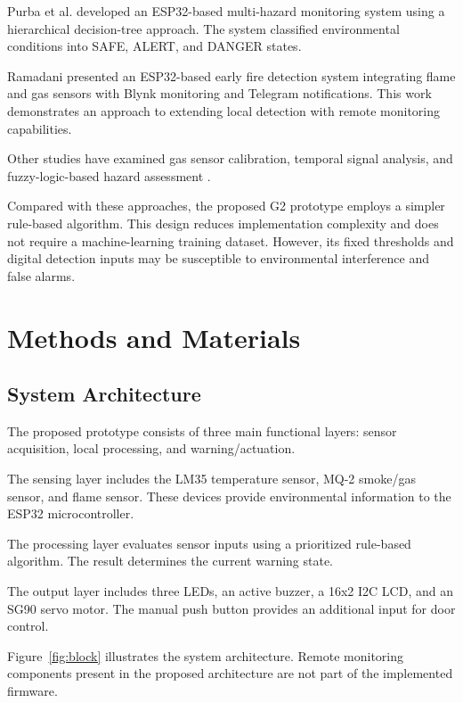 \documentclass[12pt,a4paper]{article}
\begin{document}
Purba et al. \cite{purba2026smartsafety} developed
an ESP32-based multi-hazard monitoring system
using a hierarchical decision-tree approach.
The system classified environmental conditions
into SAFE, ALERT, and DANGER states.

Ramadani \cite{ramadani2026blynk} presented an
ESP32-based early fire detection system integrating
flame and gas sensors with Blynk monitoring and
Telegram notifications. This work demonstrates
an approach to extending local detection with
remote monitoring capabilities.

Other studies have examined gas sensor calibration,
temporal signal analysis, and fuzzy-logic-based
hazard assessment
\cite{solorzano2022gas,nakip2021rtpnn,
rehman2021smartfire}.

Compared with these approaches, the proposed
G2 prototype employs a simpler rule-based algorithm.
This design reduces implementation complexity and
does not require a machine-learning training dataset.
However, its fixed thresholds and digital detection
inputs may be susceptible to environmental
interference and false alarms.

\section{Methods and Materials}

\subsection{System Architecture}

The proposed prototype consists of three main
functional layers: sensor acquisition, local
processing, and warning/actuation.

The sensing layer includes the LM35 temperature
sensor, MQ-2 smoke/gas sensor, and flame sensor.
These devices provide environmental information
to the ESP32 microcontroller.

The processing layer evaluates sensor inputs using
a prioritized rule-based algorithm. The result
determines the current warning state.

The output layer includes three LEDs, an active
buzzer, a 16x2 I2C LCD, and an SG90 servo motor.
The manual push button provides an additional
input for door control.

Figure~\ref{fig:block} illustrates the system
architecture. Remote monitoring components
present in the proposed architecture are not
part of the implemented firmware.
\end{document}
